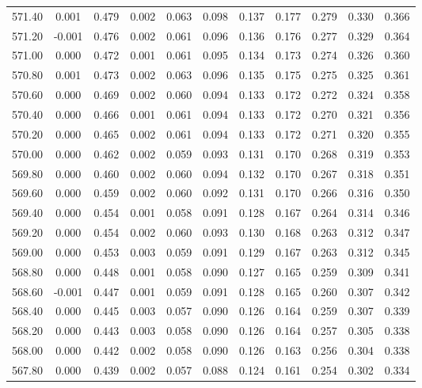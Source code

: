 \begin{longtable}{cccccccccc}
    571.40 &  0.001 &  0.479 &  0.002 &  0.063 &  0.098 &  0.137 &  0.177 &  0.279 &  0.330 &  0.366 \\
    571.20 & -0.001 &  0.476 &  0.002 &  0.061 &  0.096 &  0.136 &  0.176 &  0.277 &  0.329 &  0.364 \\
    571.00 &  0.000 &  0.472 &  0.001 &  0.061 &  0.095 &  0.134 &  0.173 &  0.274 &  0.326 &  0.360 \\
    570.80 &  0.001 &  0.473 &  0.002 &  0.063 &  0.096 &  0.135 &  0.175 &  0.275 &  0.325 &  0.361 \\
    570.60 &  0.000 &  0.469 &  0.002 &  0.060 &  0.094 &  0.133 &  0.172 &  0.272 &  0.324 &  0.358 \\
    570.40 &  0.000 &  0.466 &  0.001 &  0.061 &  0.094 &  0.133 &  0.172 &  0.270 &  0.321 &  0.356 \\
    570.20 &  0.000 &  0.465 &  0.002 &  0.061 &  0.094 &  0.133 &  0.172 &  0.271 &  0.320 &  0.355 \\
    570.00 &  0.000 &  0.462 &  0.002 &  0.059 &  0.093 &  0.131 &  0.170 &  0.268 &  0.319 &  0.353 \\
    569.80 &  0.000 &  0.460 &  0.002 &  0.060 &  0.094 &  0.132 &  0.170 &  0.267 &  0.318 &  0.351 \\
    569.60 &  0.000 &  0.459 &  0.002 &  0.060 &  0.092 &  0.131 &  0.170 &  0.266 &  0.316 &  0.350 \\
    569.40 &  0.000 &  0.454 &  0.001 &  0.058 &  0.091 &  0.128 &  0.167 &  0.264 &  0.314 &  0.346 \\
    569.20 &  0.000 &  0.454 &  0.002 &  0.060 &  0.093 &  0.130 &  0.168 &  0.263 &  0.312 &  0.347 \\
    569.00 &  0.000 &  0.453 &  0.003 &  0.059 &  0.091 &  0.129 &  0.167 &  0.263 &  0.312 &  0.345 \\
    568.80 &  0.000 &  0.448 &  0.001 &  0.058 &  0.090 &  0.127 &  0.165 &  0.259 &  0.309 &  0.341 \\
    568.60 & -0.001 &  0.447 &  0.001 &  0.059 &  0.091 &  0.128 &  0.165 &  0.260 &  0.307 &  0.342 \\
    568.40 &  0.000 &  0.445 &  0.003 &  0.057 &  0.090 &  0.126 &  0.164 &  0.259 &  0.307 &  0.339 \\
    568.20 &  0.000 &  0.443 &  0.003 &  0.058 &  0.090 &  0.126 &  0.164 &  0.257 &  0.305 &  0.338 \\
    568.00 &  0.000 &  0.442 &  0.002 &  0.058 &  0.090 &  0.126 &  0.163 &  0.256 &  0.304 &  0.338 \\
    567.80 &  0.000 &  0.439 &  0.002 &  0.057 &  0.088 &  0.124 &  0.161 &  0.254 &  0.302 &  0.334 \\

\end{longtable}
